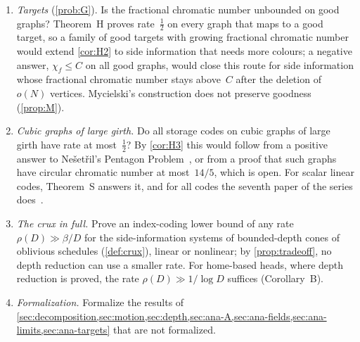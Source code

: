 \begin{enumerate}[label=\arabic*.,leftmargin=2em]
\item \emph{Targets} (\cref{prob:G}). Is the fractional chromatic number unbounded on good graphs? Theorem~H
proves rate~$\tfrac12$ on every graph that maps to a good target, so a family of good targets with growing fractional
chromatic number would extend \cref{cor:H2} to side information that needs more colours; a negative answer, $\chi_f\le C$ on all good graphs, would
close this route for side information whose fractional chromatic number stays above~$C$ after the deletion of $o(N)$
vertices. Mycielski's construction does not preserve goodness (\cref{prop:M}).

\item \emph{Cubic graphs of large girth.} Do all storage codes on cubic graphs of large girth have rate at most~$\tfrac12$?
By \cref{cor:H3} this would follow from a positive answer to Nešetřil's Pentagon Problem~\cite{Nesetril1999}, or
from a proof that such graphs have circular chromatic number at most~$14/5$, which is open. For scalar linear codes, Theorem~S answers it,
and for all codes the seventh paper of the series does~\cite[Theorem~N3]{NestedElimination2026}.

\item \emph{The crux in full.} Prove an index-coding lower bound of any rate $\rho(D)\gg\beta/D$ for the side-information
systems of bounded-depth cones of oblivious schedules (\cref{def:crux}), linear or nonlinear; by \cref{prop:tradeoff},
no depth reduction can use a smaller rate. For home-based heads, where depth reduction is
proved, the rate $\rho(D)\gg1/\log D$ suffices (Corollary~B).

\item \emph{Formalization.} Formalize the results of
\cref{sec:decomposition,sec:motion,sec:depth,sec:ana-A,sec:ana-fields,sec:ana-limits,sec:ana-targets} that are not
formalized.
\end{enumerate}
